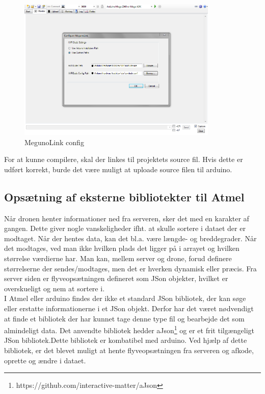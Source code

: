 \newpage

\begin{figure}[H]
	\centering
	\includegraphics[width=0.85\textwidth]{Billeder/implementation/megunolink_config.png}
	\vspace{-.5cm}
	\caption{MegunoLink config}
	\label{fig:meglinkconf}
\end{figure}

For at kunne compilere, skal der linkes til projektets source fil. Hvis dette er udført korrekt, burde det være muligt at uploade source filen til arduino.

\subsection{Opsætning af eksterne bibliotekter til Atmel}

Når dronen henter informationer ned fra serveren, sker det med en karakter af gangen. Dette giver nogle vanskeligheder ifht. at skulle sortere i dataet der er modtaget. Når der hentes data, kan det bl.a. være længde- og breddegrader. Når det modtages, ved man ikke hvilken plads det ligger på i arrayet og hvilken størrelse værdierne har. Man kan, mellem server og drone, forud definere størrelserne der sendes/modtages, men det er hverken dynamisk eller præcis. Fra server siden er flyveopsætningen defineret som JSon objekter, hvilket er overskueligt og nem at sortere i. \\
I Atmel eller arduino findes der ikke et standard JSon bibliotek, der kan søge eller erstatte informationerne i et JSon objekt. Derfor har det været nødvendigt at finde et bibliotek der har kunnet tage denne type fil og bearbejde det som almindeligt data. Det anvendte bibliotek hedder aJson\footnote{https://github.com/interactive-matter/aJson} og er et frit tilgængeligt JSon bibliotek.Dette bibliotek er kombatibel med arduino. Ved hjælp af dette bibliotek, er det blevet muligt at hente flyveopsætningen fra serveren og afkode, oprette og ændre i dataet.